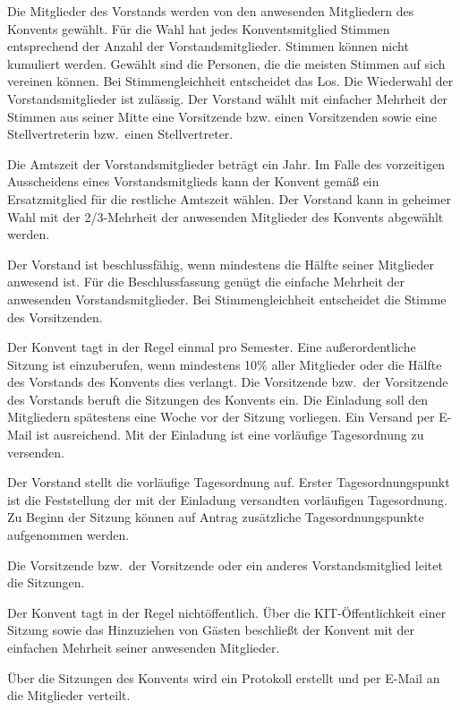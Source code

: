 \documentclass[a4paper, parskip=half, numbers=noenddot]{scrartcl}
\begin{document}
\begin{contract}
Die Mitglieder des Vorstands werden von den anwesenden Mitgliedern des Konvents gewählt. Für
die Wahl hat jedes Konventsmitglied Stimmen entsprechend der Anzahl der Vorstandsmitglieder. Stimmen können nicht kumuliert werden.
Gewählt sind die Personen, die die meisten Stimmen auf sich vereinen können. Bei Stimmengleichheit entscheidet das Los. Die Wiederwahl der Vorstandsmitglieder ist zulässig.
Der Vorstand wählt mit einfacher Mehrheit der Stimmen aus seiner Mitte eine Vorsitzende bzw.
einen Vorsitzenden sowie eine Stellvertreterin bzw.\ einen Stellvertreter.
\label{wahl}

Die Amtszeit der Vorstandsmitglieder beträgt ein Jahr. Im Falle des vorzeitigen Ausscheidens
eines Vorstandsmitglieds kann der Konvent gemäß  ein Ersatzmitglied für die restliche Amtszeit wählen. Der Vorstand kann in geheimer Wahl mit der 2/3-Mehrheit der anwesenden Mitglieder des Konvents abgewählt werden.

Der Vorstand ist beschlussfähig, wenn mindestens die Hälfte seiner Mitglieder anwesend ist. Für die Beschlussfassung genügt die einfache Mehrheit der anwesenden Vorstandsmitglieder. Bei Stimmengleichheit entscheidet die Stimme des Vorsitzenden.


Der Konvent tagt in der Regel einmal pro Semester. 
Eine außerordentliche Sitzung ist einzuberufen, wenn mindestens 10\% aller Mitglieder oder die Hälfte des Vorstands des Konvents dies verlangt.
Die Vorsitzende bzw.\ der Vorsitzende des Vorstands beruft die Sitzungen des Konvents ein.
Die Einladung soll den Mitgliedern spätestens eine Woche vor der Sitzung vorliegen. Ein Versand per E-Mail ist ausreichend. Mit der Einladung ist eine vorläufige Tagesordnung zu versenden.

Der Vorstand stellt die vorläufige Tagesordnung auf. Erster Tagesordnungspunkt ist die Feststellung der mit der Einladung versandten vorläufigen Tagesordnung. Zu Beginn der Sitzung können auf Antrag zusätzliche Tagesordnungspunkte aufgenommen werden.

Die Vorsitzende bzw.\ der Vorsitzende oder ein anderes Vorstandsmitglied leitet die Sitzungen.	

Der Konvent tagt in der Regel nichtöffentlich. Über die KIT-Öffentlichkeit einer Sitzung sowie das Hinzuziehen von Gästen beschließt der Konvent mit der einfachen Mehrheit seiner anwesenden Mitglieder.

Über die Sitzungen des Konvents wird ein Protokoll erstellt und per E-Mail an die Mitglieder verteilt.


\end{contract}
\end{document}
